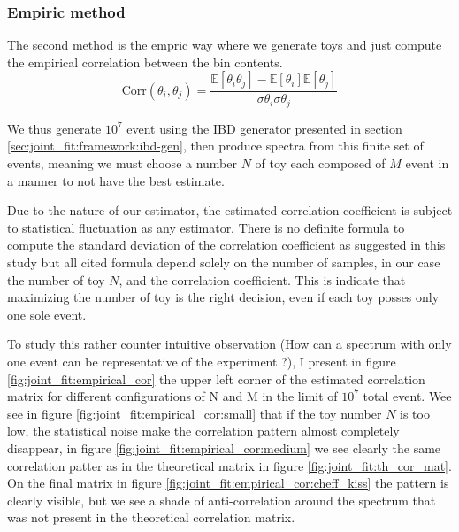 \documentclass[../main.tex]{subfiles}
\begin{document}
\subsubsection{Empiric method}

The second method is the empric way where we generate toys and just compute the empirical correlation between the bin contents.
\begin{equation}
  \mathrm{Corr}(\theta_i, \theta_j) = \frac{\mathbb{E}[\theta_i \theta_j] - \mathbb{E}[\theta_i] \mathbb{E}[\theta_j]}{\sigma \theta_i \sigma \theta_j}
\end{equation}

We thus generate $10^7$ event using the IBD generator presented in section \ref{sec:joint_fit:framework:ibd-gen}, then produce spectra from this finite set of events, meaning we must choose a number $N$ of toy each composed of $M$ event in a manner to not have the best estimate.

Due to the nature of our estimator, the estimated correlation coefficient is subject to statistical fluctuation as any estimator. There is no definite formula to compute the standard deviation of the correlation coefficient as suggested in this study \cite{gnambs_brief_2023} but all cited formula depend solely on the number of samples, in our case the number of toy $N$, and the correlation coefficient. This is indicate that maximizing the number of toy is the right decision, even if each toy posses only one sole event.

To study this rather counter intuitive observation (How can a spectrum with only one event can be representative of the experiment ?), I present in figure \ref{fig:joint_fit:empirical_cor} the upper left corner of the estimated correlation matrix for different configurations of N and M in the limit of $10^7$ total event. Wee see in figure \ref{fig:joint_fit:empirical_cor:small} that if the toy number $N$ is too low, the statistical noise make the correlation pattern almost completely disappear, in figure \ref{fig:joint_fit:empirical_cor:medium} we see clearly the same correlation patter as in the theoretical matrix in figure \ref{fig:joint_fit:th_cor_mat}.
On the final matrix in figure \ref{fig:joint_fit:empirical_cor:cheff_kiss} the pattern is clearly visible, but we see a shade of anti-correlation around the spectrum that was not present in the theoretical correlation matrix.
\end{document}
